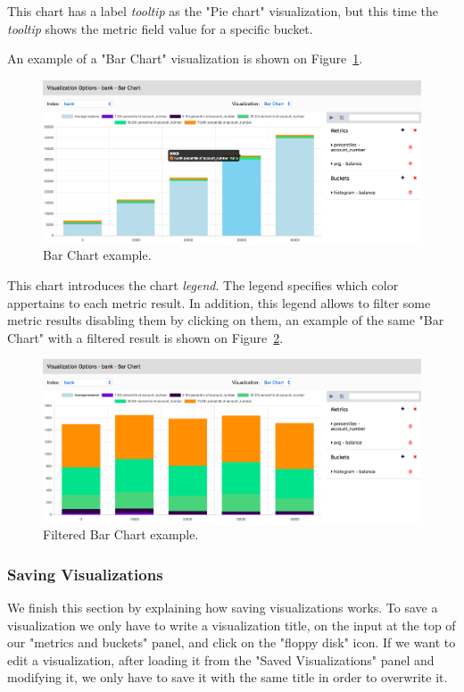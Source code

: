 \documentclass[a4paper, 12pt, english]{book}
\begin{document}
This chart has a label \textit{tooltip} as the "Pie chart" visualization, but this time the \textit{tooltip} shows the metric field value for a specific bucket.

An example of a "Bar Chart" visualization is shown on Figure~\ref{fig:bar-chart-calculation}.
\begin{figure}
  \centering
  \includegraphics[width=16cm, keepaspectratio]{img/bar-chart-calculation.png}
  \caption{Bar Chart example.}
  \label{fig:bar-chart-calculation}
\end{figure}

This chart introduces the chart \textit{legend}. The legend specifies which color appertains to each metric result. In addition, this legend allows to filter some metric results disabling them by clicking on them, an example of the same "Bar Chart" with a filtered result is shown on Figure~\ref{fig:bar-chart-lengend-filter-example}.
\begin{figure}
  \centering
  \includegraphics[width=16cm, keepaspectratio]{img/bar-chart-lengend-filter-example.png}
  \caption{Filtered Bar Chart example.}
  \label{fig:bar-chart-lengend-filter-example}
\end{figure}

\subsubsection{Saving Visualizations}
\label{sec:saving-visualizations}
We finish this section by explaining how saving visualizations works. To save a visualization we only have to write a visualization title, on the input at the top of our "metrics and buckets" panel, and click on the "floppy disk" icon. If we want to edit a visualization, after loading it from the "Saved Visualizations" panel and modifying it, we only have to save it with the same title in order to overwrite it.
\end{document}
